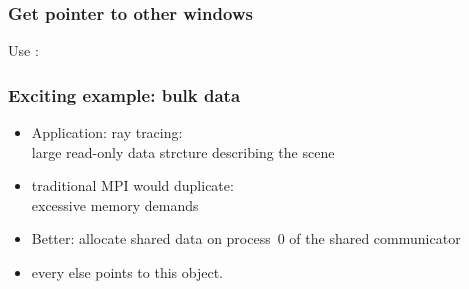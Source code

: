\begin{frame}[containsverbatim]\frametitle{Get pointer to other windows}
  Use :
\end{frame}

\begin{frame}[containsverbatim]\frametitle{Exciting example: bulk data}
  \begin{itemize}
  \item Application: ray tracing:\\
    large read-only data strcture describing the scene
  \item traditional MPI would duplicate:\\
    excessive memory demands
  \item Better: allocate shared data on process~0 of the shared communicator
  \item every else points to this object.
  \end{itemize}
\end{frame}

\begin{exerciseframe}[shareddata]
    
\end{exerciseframe}

\endinput

\begin{frame}[containsverbatim]\frametitle{}
\begin{lstlisting}
  
\end{lstlisting}
\end{frame}

